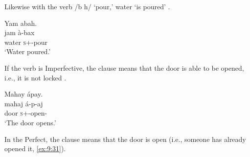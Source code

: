 Likewise with the verb /b h/ ‘pour,’ water ‘is poured’ .  

\ea \label{ex:9:29}
Yam  abah.\\
\gll  jam     à-bax\\
      water  \textsc{s}+{\PFV}-pour\\
\glt  ‘Water poured.’
\z

If the verb is Imperfective, the clause means that the door is able to be opened, i.e., it is not locked .

\ea \label{ex:9:30}
Mahay  ápay.\\
\gll  mahaj   á-p-aj\\
      door  \textsc{s}+{\IFV}-open{}-{\CL}\\
\glt  ‘The door opens.’
\z

In the Perfect, the clause means that the door is open (i.e., someone has already opened it, \ref{ex:9:31}).

